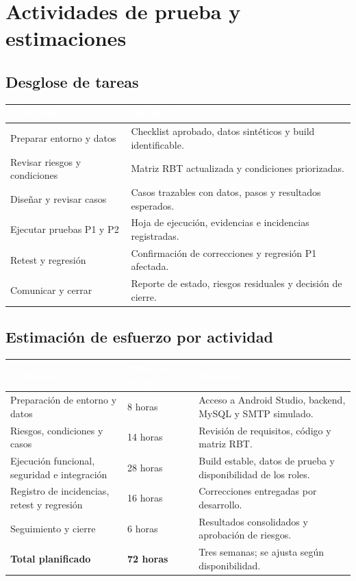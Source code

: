 \documentclass[11pt,a4paper]{article}
\newcommand{\thead}[1]{\textcolor{white}{\textbf{#1}}}
\begin{document}
\section{Actividades de prueba y estimaciones}

\subsection{Desglose de tareas}
\begin{tabularx}{\textwidth}{p{3.3cm}Y}
\thead{Actividad} & \thead{Resultado}\\
\midrule
Preparar entorno y datos & Checklist aprobado, datos sintéticos y build identificable.\\
Revisar riesgos y condiciones & Matriz RBT actualizada y condiciones priorizadas.\\
Diseñar y revisar casos & Casos trazables con datos, pasos y resultados esperados.\\
Ejecutar pruebas P1 y P2 & Hoja de ejecución, evidencias e incidencias registradas.\\
Retest y regresión & Confirmación de correcciones y regresión P1 afectada.\\
Comunicar y cerrar & Reporte de estado, riesgos residuales y decisión de cierre.\\
\end{tabularx}

\subsection{Estimación de esfuerzo por actividad}
\begin{tabularx}{\textwidth}{p{4.2cm}p{2.2cm}Y}
\thead{Actividad} & \thead{Esfuerzo estimado} & \thead{Dependencia}\\
\midrule
Preparación de entorno y datos & 8 horas & Acceso a Android Studio, backend, MySQL y SMTP simulado.\\
Riesgos, condiciones y casos & 14 horas & Revisión de requisitos, código y matriz RBT.\\
Ejecución funcional, seguridad e integración & 28 horas & Build estable, datos de prueba y disponibilidad de los roles.\\
Registro de incidencias, retest y regresión & 16 horas & Correcciones entregadas por desarrollo.\\
Seguimiento y cierre & 6 horas & Resultados consolidados y aprobación de riesgos.\\
\textbf{Total planificado} & \textbf{72 horas} & Tres semanas; se ajusta según disponibilidad.\\
\end{tabularx}
\end{document}
